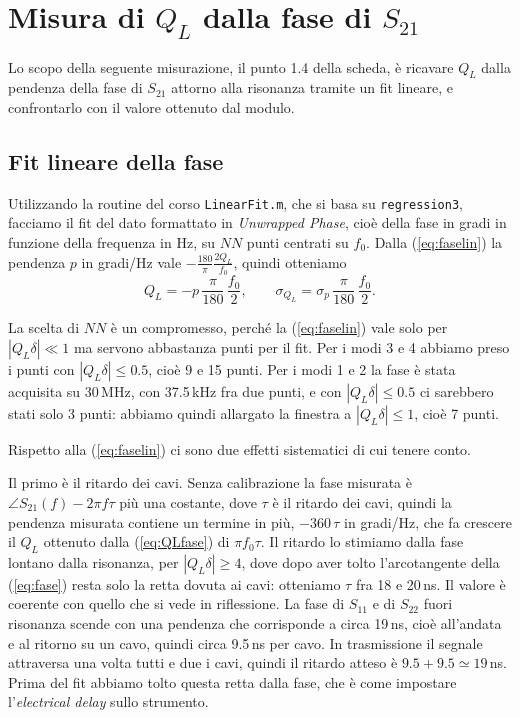 \documentclass[11pt,a4paper,oneside]{book}
\begin{document}
\chapter{Misura di $Q_L$ dalla fase di $S_{21}$}
\label{cap:fase}

Lo scopo della seguente misurazione, il punto 1.4 della scheda, è ricavare $Q_L$ dalla pendenza della fase di $S_{21}$ attorno alla risonanza tramite un fit lineare, e confrontarlo con il valore ottenuto dal modulo.

\section{Fit lineare della fase}
Utilizzando la routine del corso \texttt{LinearFit.m}, che si basa su \texttt{regression3}, facciamo il fit del dato formattato in \emph{Unwrapped Phase}, cioè della fase in gradi in funzione della frequenza in Hz, su $NN$ punti centrati su $f_0$. Dalla (\ref{eq:faselin}) la pendenza $p$ in gradi/Hz vale $-\frac{180}{\pi}\frac{2Q_L}{f_0}$, quindi otteniamo
\begin{equation}
Q_L=-p\,\frac{\pi}{180}\,\frac{f_0}{2},\qquad \sigma_{Q_L}=\sigma_p\,\frac{\pi}{180}\,\frac{f_0}{2}.
\label{eq:QLfase}
\end{equation}

La scelta di $NN$ è un compromesso, perché la (\ref{eq:faselin}) vale solo per $|Q_L\delta|\ll1$ ma servono abbastanza punti per il fit. Per i modi 3 e 4 abbiamo preso i punti con $|Q_L\delta|\le0.5$, cioè 9 e 15 punti. Per i modi 1 e 2 la fase è stata acquisita su 30\,MHz, con 37.5\,kHz fra due punti, e con $|Q_L\delta|\le0.5$ ci sarebbero stati solo 3 punti: abbiamo quindi allargato la finestra a $|Q_L\delta|\le1$, cioè 7 punti.

Rispetto alla (\ref{eq:faselin}) ci sono due effetti sistematici di cui tenere conto.

Il primo è il ritardo dei cavi. Senza calibrazione la fase misurata è $\angle S_{21}(f)-2\pi f\tau$ più una costante, dove $\tau$ è il ritardo dei cavi, quindi la pendenza misurata contiene un termine in più, $-360\,\tau$ in gradi/Hz, che fa crescere il $Q_L$ ottenuto dalla (\ref{eq:QLfase}) di $\pi f_0\tau$. Il ritardo lo stimiamo dalla fase lontano dalla risonanza, per $|Q_L\delta|\ge4$, dove dopo aver tolto l'arcotangente della (\ref{eq:fase}) resta solo la retta dovuta ai cavi: otteniamo $\tau$ fra 18 e 20\,ns. Il valore è coerente con quello che si vede in riflessione. La fase di $S_{11}$ e di $S_{22}$ fuori risonanza scende con una pendenza che corrisponde a circa 19\,ns, cioè all'andata e al ritorno su un cavo, quindi circa 9.5\,ns per cavo. In trasmissione il segnale attraversa una volta tutti e due i cavi, quindi il ritardo atteso è $9.5+9.5\simeq19$\,ns. Prima del fit abbiamo tolto questa retta dalla fase, che è come impostare l'\emph{electrical delay} sullo strumento.
\end{document}
